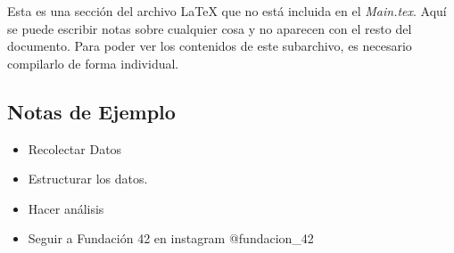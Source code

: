 \documentclass[../Main.tex]{subfiles}
\begin{document}
Esta es una sección del archivo \LaTeX{} que no está incluida en el \textit{Main.tex}. Aquí se puede escribir notas sobre cualquier cosa y no aparecen con el resto del documento. Para poder ver los contenidos de este subarchivo, es necesario compilarlo de forma individual.

\subsection{Notas de Ejemplo}
\begin{itemize}
    \item Recolectar Datos
    \item Estructurar los datos.
    \item Hacer análisis
    \item Seguir a Fundación 42 en instagram @fundacion\_42 
\end{itemize}

\biblio %
\end{document}
